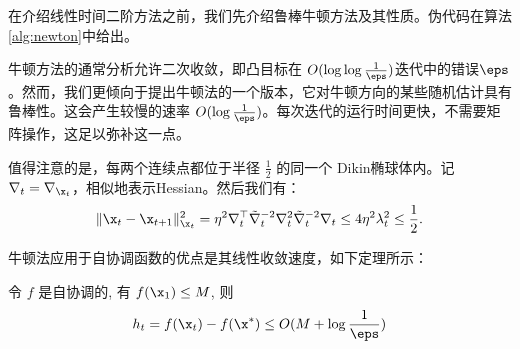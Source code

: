 在介绍线性时间二阶方法之前，我们先介绍鲁棒牛顿方法及其性质。伪代码在算法\ref{alg:newton}中给出。

牛顿方法的通常分析允许二次收敛，即凸目标在 $O(\log \log \frac{1}{\eps})$迭代中的错误$\eps$。然而，我们更倾向于提出牛顿法的一个版本，它对牛顿方向的某些随机估计具有鲁棒性。这会产生较慢的速率 $O(\log \frac{1}{\eps})$。每次迭代的运行时间更快，不需要矩阵操作，这足以弥补这一点。


\begin{algorithm}[h!]
\caption{\textbf{
    鲁棒牛顿法
    }}
\label{alg:newton}
\begin{algorithmic}
\ENDFOR


\end{algorithmic}
\end{algorithm}

值得注意的是，每两个连续点都位于半径 $\frac{1}{2}$ 的同一个 Dikin椭球体内。记 $\nabla_t = \nabla_{\x_t}$，相似地表示Hessian。然后我们有：
$$ \| \x_t - \x_{t+1} \|_{\x_t}^2 =  \eta^2 \nabla_t^\top  \tilde{\nabla}^{-2}_t  \nabla_t^2 \tilde{\nabla}^{-2}_t \nabla_t \leq 4 \eta^2  \lambda_t^2 \leq \frac{1}{2} . $$ 

牛顿法应用于自协调函数的优点是其线性收敛速度，如下定理所示：
\begin{theorem}
令 $f$ 是自协调的, 有 $f(\x_1) \leq M$, 则
$$ h_t = f(\x_t) - f(\x^*) \leq O( {M} +   \log \frac{1}{\eps} ) $$
\end{theorem}

